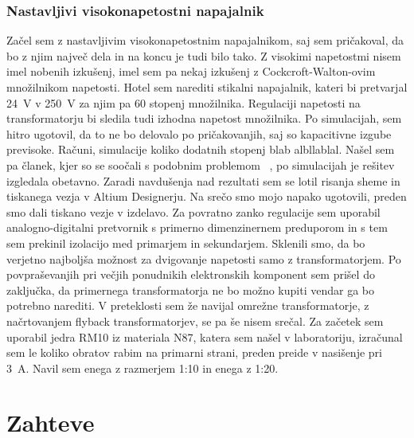 \documentclass[a4paper,twoside,openright,12pt,slovene]{book}
\begin{document}
	\subsection{Nastavljivi visokonapetostni napajalnik}
	Začel sem z nastavljivim visokonapetostnim napajalnikom, saj sem pričakoval, da bo z njim največ dela in na koncu je tudi bilo tako. Z visokimi napetostmi nisem imel nobenih izkušenj, imel sem pa nekaj izkušenj z Cockcroft-Walton-ovim množilnikom napetosti. Hotel sem narediti stikalni napajalnik, kateri bi pretvarjal \SI{24}{\volt} v \SI{250}{\volt} za njim pa 60 stopenj množilnika. Regulaciji napetosti na transformatorju bi sledila tudi izhodna napetost množilnika. Po simulacijah, sem hitro ugotovil, da to ne bo delovalo po pričakovanjih, saj so kapacitivne izgube previsoke. Računi, simulacije koliko dodatnih stopenj blab albllablal. Našel sem pa članek, kjer so se soočali s podobnim problemom ~\cite{Using Parallel High Voltage Multipliers for 100kV Downhole Neutron Generator Power Supplies}, po simulacijah je rešitev izgledala obetavno. Zaradi navdušenja nad rezultati sem se lotil risanja sheme in tiskanega vezja v Altium Designerju. Na srečo smo mojo napako ugotovili, preden smo dali tiskano vezje v izdelavo. Za povratno zanko regulacije sem uporabil analogno-digitalni pretvornik s primerno dimenzinernem preduporom in s tem sem prekinil izolacijo med primarjem in sekundarjem. Sklenili smo, da bo verjetno najboljša možnost za dvigovanje napetosti samo z transformatorjem. Po povpraševanjih pri večjih ponudnikih elektronskih komponent sem prišel do zaključka, da primernega transformatorja ne bo možno kupiti vendar ga bo potrebno narediti. V preteklosti sem že navijal omrežne transformatorje, z načrtovanjem flyback transformatorjev, se pa še nisem srečal. Za začetek sem uporabil jedra RM10 iz materiala N87, katera sem našel v laboratoriju, izračunal sem le koliko obratov rabim na primarni strani, preden preide v nasišenje pri \SI{3}{\ampere}. Navil sem enega z razmerjem 1:10 in enega z 1:20.


\chapter{Zahteve} \label{Zahteve}
\end{document}
